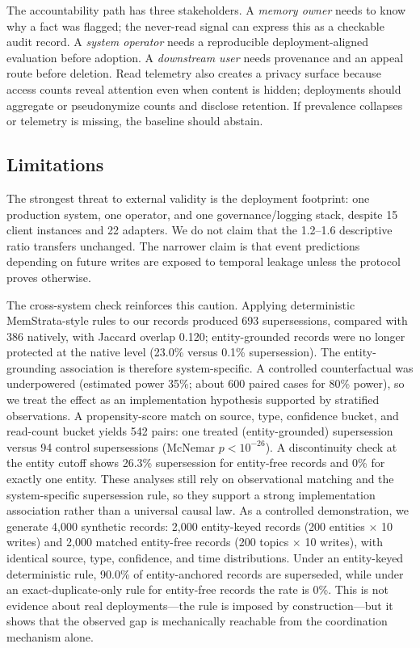 \documentclass[sigconf,nonacm]{acmart}
\begin{document}
The accountability path has three stakeholders. A \emph{memory owner} needs to know why a fact was flagged; the never-read signal can express this as a checkable audit record. A \emph{system operator} needs a reproducible deployment-aligned evaluation before adoption. A \emph{downstream user} needs provenance and an appeal route before deletion. Read telemetry also creates a privacy surface because access counts reveal attention even when content is hidden; deployments should aggregate or pseudonymize counts and disclose retention. If prevalence collapses or telemetry is missing, the baseline should abstain.
\subsection{Limitations}
\label{sec:limitations}

The strongest threat to external validity is the deployment footprint: one production system, one operator, and one governance/logging stack, despite 15 client instances and 22 adapters. We do not claim that the 1.2--1.6 descriptive ratio transfers unchanged. The narrower claim is that event predictions depending on future writes are exposed to temporal leakage unless the protocol proves otherwise.

The cross-system check reinforces this caution. Applying deterministic MemStrata-style rules to our records produced 693 supersessions, compared with 386 natively, with Jaccard overlap 0.120; entity-grounded records were no longer protected at the native level (23.0\% versus 0.1\% supersession). The entity-grounding association is therefore system-specific. A controlled counterfactual was underpowered (estimated power 35\%; about 600 paired cases for 80\% power), so we treat the effect as an implementation hypothesis supported by stratified observations.
A propensity-score match on source, type, confidence bucket, and read-count bucket yields 542 pairs: one treated (entity-grounded) supersession versus 94 control supersessions (McNemar $p<10^{-26}$). A discontinuity check at the entity cutoff shows 26.3\% supersession for entity-free records and 0\% for exactly one entity. These analyses still rely on observational matching and the system-specific supersession rule, so they support a strong implementation association rather than a universal causal law. As a controlled demonstration, we generate 4,000 synthetic records: 2,000 entity-keyed records (200 entities $\times$ 10 writes) and 2,000 matched entity-free records (200 topics $\times$ 10 writes), with identical source, type, confidence, and time distributions. Under an entity-keyed deterministic rule, 90.0\% of entity-anchored records are superseded, while under an exact-duplicate-only rule for entity-free records the rate is 0\%. This is not evidence about real deployments---the rule is imposed by construction---but it shows that the observed gap is mechanically reachable from the coordination mechanism alone.
\end{document}
